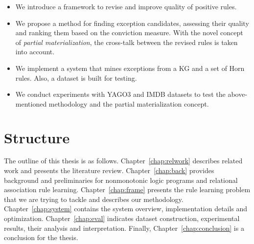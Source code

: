 \begin{itemize}
\item We introduce a framework to revise and improve quality of positive rules.
\item We propose a method for finding exception candidates, assessing their quality and ranking them based on the conviction measure. With the novel concept of \textit{partial materialization}, the cross-talk between the revised rules is taken into account.
\item We implement a system that mines exceptions from a KG and a set of Horn rules. Also, a dataset is built for testing.
\item We conduct experiments with YAGO3 and IMDB datasets to test the above-mentioned methodology and the partial materialization concept.
\end{itemize}

\section{Structure}

The outline of this thesis is as follows. Chapter~\ref{chap:relwork} describes related work and presents the literature review. Chapter~\ref{chap:back} provides background and preliminaries for nonmonotonic logic programs and relational association rule learning. Chapter~\ref{chap:frame} presents the rule learning problem that we are trying to tackle and describes our methodology. Chapter~\ref{chap:system} contains the system overview, implementation details and optimization. Chapter~\ref{chap:eval} indicates dataset construction, experimental results, their analysis and interpretation. Finally, Chapter~\ref{chap:conclusion} is a conclusion for the thesis.